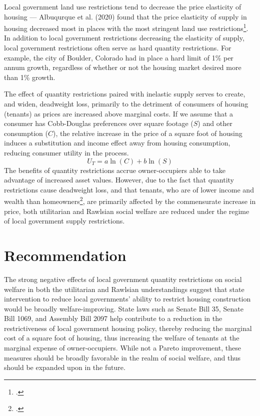 \documentclass[12pt]{extarticle}
\newlength\tindent
\renewcommand{\indent}{\hspace*{\tindent}}
\begin{document}
  \indent Local government land use restrictions tend to decrease the price elasticity of housing --- Albuqurque et al. (2020) found that the price elasticity of supply in housing decreased most in places with the most stringent land use restrictions\footcite{albuquerque_2020}. In addition to local government restrictions decreasing the elasticity of supply, local government restrictions often serve as hard quantity restrictions. For example, the city of Boulder, Colorado had in place a hard limit of 1\% per annum growth, regardless of whether or not the housing market desired more than 1\% growth.

  \indent The effect of quantity restrictions paired with inelastic supply serves to create, and widen, deadweight loss, primarily to the detriment of consumers of housing (tenants) as prices are increased above marginal costs. If we assume that a consumer has Cobb-Douglas preferences over square footage ($S$) and other consumption ($C$), the relative increase in the price of a square foot of housing induces a substitution and income effect away from housing consumption, reducing consumer utility in the process.
  \[U_{T} = a\ln(C) + b\ln(S)\]
  \indent The benefits of quantity restrictions accrue owner-occupiers able to take advantage of increased asset values. However, due to the fact that quantity restrictions cause deadweight loss, and that tenants, who are of lower income and wealth than homeowners\footcite{tenant_income}, are primarily affected by the commensurate increase in price, both utilitarian and Rawlsian social welfare are reduced under the regime of local government supply restrictions.
  \section*{Recommendation}%
  The strong negative effects of local government quantity restrictions on social welfare in both the utilitarian and Rawlsian understandings suggest that state intervention to reduce local governments' ability to restrict housing construction would be broadly welfare-improving. State laws such as Senate Bill 35, Senate Bill 1069, and Assembly Bill 2097 help contribute to a reduction in the restrictiveness of local government housing policy, thereby reducing the marginal cost of a square foot of housing, thus increasing the welfare of tenants at the marginal expense of owner-occupiers. While not a Pareto improvement, these measures should be broadly favorable in the realm of social welfare, and thus should be expanded upon in the future.
  \printbibliography
\end{document}
